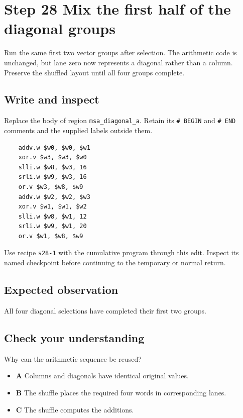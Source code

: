 \section{Step 28 Mix the first half of the diagonal groups}\label{chacha-s28}

Run the same first two vector groups after selection. The arithmetic code is unchanged, but lane zero now represents a diagonal rather than a column. Preserve the shuffled layout until all four groups complete.

\subsection{Write and inspect}
Replace the body of region \texttt{msa\_diagonal\_a}. Retain its \texttt{\# BEGIN} and \texttt{\# END} comments and the supplied labels outside them.

\begin{verbatim}
    addv.w $w0, $w0, $w1
    xor.v $w3, $w3, $w0
    slli.w $w8, $w3, 16
    srli.w $w9, $w3, 16
    or.v $w3, $w8, $w9
    addv.w $w2, $w2, $w3
    xor.v $w1, $w1, $w2
    slli.w $w8, $w1, 12
    srli.w $w9, $w1, 20
    or.v $w1, $w8, $w9
\end{verbatim}

Use recipe \texttt{s28-1} with the cumulative program through this edit. Inspect its named checkpoint before continuing to the temporary or normal return.

\subsection{Expected observation}
All four diagonal selections have completed their first two groups.

\subsection{Check your understanding}
Why can the arithmetic sequence be reused?

\begin{itemize}
  \item \textbf{A} Columns and diagonals have identical original values.
  \item \textbf{B} The shuffle places the required four words in corresponding lanes.
  \item \textbf{C} The shuffle computes the additions.
\end{itemize}
